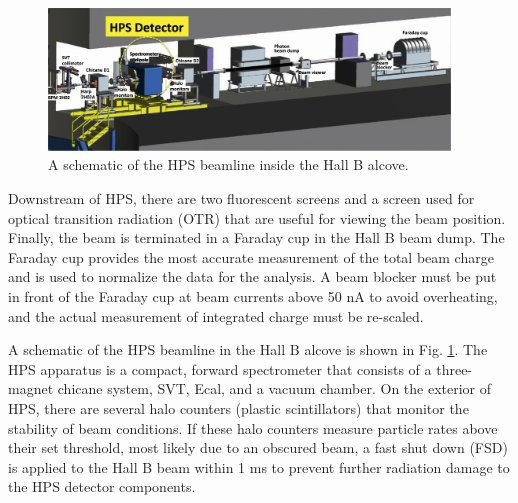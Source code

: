\begin{figure}
    \centering
    \includegraphics[width=0.95\textwidth]{figs/detector/hpsbeamline.jpg}
    \caption{A schematic of the HPS beamline inside the Hall B alcove.}
    \label{fig:hpsbeamline}
\end{figure}

Downstream of HPS, there are two fluorescent screens and a screen used for optical transition radiation (OTR) that are useful for viewing the beam position. Finally, the beam is terminated in a Faraday cup in the Hall B beam dump. The Faraday cup provides the most accurate measurement of the total beam charge and is used to normalize the data for the analysis. A beam blocker must be put in front of the Faraday cup at beam currents above 50 nA to avoid overheating, and the actual measurement of integrated charge must be re-scaled.

A schematic of the HPS beamline in the Hall B alcove is shown in Fig. \ref{fig:hpsbeamline}. The HPS apparatus is a compact, forward spectrometer that consists of a three-magnet chicane system, SVT, Ecal, and a vacuum chamber. On the exterior of HPS, there are several halo counters (plastic scintillators) that monitor the stability of beam conditions. If these halo counters measure particle rates above their set threshold, most likely due to an obscured beam, a fast shut down (FSD) is applied to the Hall B beam within 1 ms to prevent further radiation damage to the HPS detector components.

